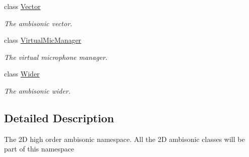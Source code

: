 \begin{DoxyCompactItemize}
\item 
class \hyperlink{class_hoa2_d_1_1_vector}{Vector}
\begin{DoxyCompactList}\small\item\em The ambisonic vector. \end{DoxyCompactList}\item 
class \hyperlink{class_hoa2_d_1_1_virtual_mic_manager}{Virtual\-Mic\-Manager}
\begin{DoxyCompactList}\small\item\em The virtual microphone manager. \end{DoxyCompactList}\item 
class \hyperlink{class_hoa2_d_1_1_wider}{Wider}
\begin{DoxyCompactList}\small\item\em The ambisonic wider. \end{DoxyCompactList}\end{DoxyCompactItemize}


\subsection{Detailed Description}
The 2\-D high order ambisonic namespace. All the 2\-D ambisonic classes will be part of this namespace 